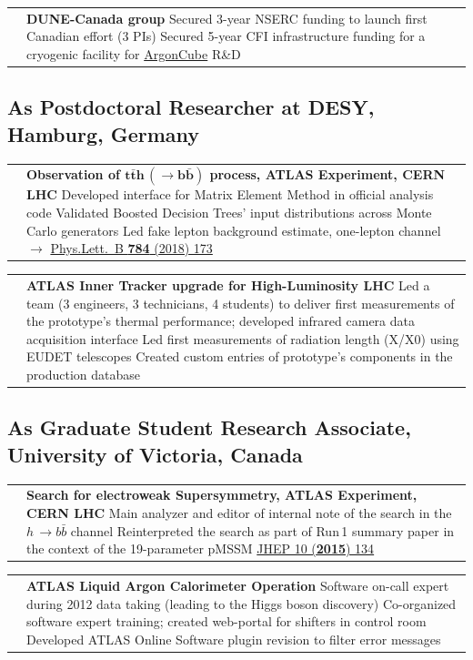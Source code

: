 \documentclass[a4paper,11pt,oneside]{article}
\makeatletter
\newcommand{\light}[1]{\textcolor{cvgray}{{\small #1}}}
\newlength{\datecol}\setlength{\datecol}{2.3cm}
\newlength{\contentcol}
\newlength{\supdatecol}\setlength{\supdatecol}{2cm}
\newlength{\supcontentcol}
\newcommand{\suprow}[2]{%
  \begingroup
  \arrayrulecolor{cvblue}%
  \setlength{\arrayrulewidth}{0.5pt}%
  \setlength{\extrarowheight}{0.5pt}%
  \noindent\begin{tabular}{@{}%
      >{\centering\arraybackslash}m{\supdatecol}%
      @{\hspace{6pt}}|@{\hspace{8pt}}%
      >{\arraybackslash}m{\supcontentcol}@{}}
    {\small #1} & #2
  \end{tabular}%
  \endgroup
  \vspace{7pt}\par}
\newcommand{\h}[1]{\vspace{10pt}\subsection{#1}}
\makeatother
\begin{document}
\suprow{2019\,--\,2023}{%
  \textbf{DUNE-Canada group}\newline
  \light{Secured 3-year NSERC funding to launch first Canadian effort (3 PIs)}\newline
  \light{Secured 5-year CFI infrastructure funding for a cryogenic facility for
  \href{https://argoncube.org/}{ArgonCube} R\&D}%
}

\h{As Postdoctoral Researcher at DESY, Hamburg, Germany}

\suprow{2017\,--\,2019}{%
  \textbf{Observation of $\bm{t\bar{t}h\,(\rightarrow b\bar{b})}$ process, ATLAS Experiment, CERN LHC}\newline
  \light{Developed interface for Matrix Element Method in official analysis code}\newline
  \light{Validated Boosted Decision Trees' input distributions across Monte Carlo generators}\newline
  \light{Led fake lepton background estimate, one-lepton channel $\rightarrow$
  \href{https://doi.org/10.1016/j.physletb.2018.07.035}{Phys.Lett.\ B \textbf{784} (2018) 173}}%
}

\suprow{2016\,--\,2019}{%
  \textbf{ATLAS Inner Tracker upgrade for High-Luminosity LHC}\newline
  \light{Led a team (3 engineers, 3 technicians, 4 students) to deliver first measurements of the prototype's thermal performance; developed infrared camera data acquisition interface}\newline
  \light{Led first measurements of radiation length (X/X0) using EUDET telescopes}\newline
  \light{Created custom entries of prototype's components in the production database}%
}

\h{As Graduate Student Research Associate, University of Victoria, Canada}

\suprow{2013\,--\,2015}{%
  \textbf{Search for electroweak Supersymmetry, ATLAS Experiment, CERN LHC}\newline
  \light{Main analyzer and editor of internal note of the search in the $h\,\rightarrow b\bar{b}$ channel}\newline
  \light{Reinterpreted the search as part of Run\,1 summary paper in the context of the 19-parameter pMSSM}\newline
  \light{\href{http://link.springer.com/article/10.1007\%2FJHEP10\%282015\%29134}{JHEP 10 (\textbf{2015}) 134}}%
}

\suprow{2012\,--\,2013}{%
  \textbf{ATLAS Liquid Argon Calorimeter Operation}\newline
  \light{Software on-call expert during 2012 data taking (leading to the Higgs boson discovery)}\newline
  \light{Co-organized software expert training; created web-portal for shifters in control room}\newline
  \light{Developed ATLAS Online Software plugin revision to filter error messages}%
}
\end{document}
